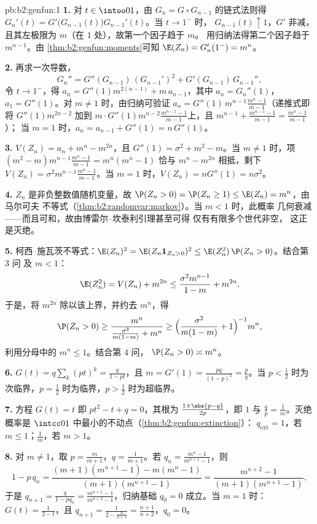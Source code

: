 \begin{solution}{pb:b2:genfun:1}
\textbf{1.} 对 $t \in \intoo01$，由 $G_n = G
\circ G_{n-1}$ 的链式法则得 $G_n'(t) =
G'\bigl(G_{n-1}(t)\bigr)G_{n-1}'(t)$。当 $t \to 1^-$ 时，
$G_{n-1}(t) \uparrow 1$，$G'$ 非减，
且其左极限为 $m$（在 $1$ 处），故第一个因子趋于 $m$。
用归纳法得第二个因子趋于 $m^{n-1}$。由
\cref{thm:b2:genfun:moments}可知 $\E(Z_n) = G_n'(1^-) = m^n$。

\textbf{2.} 再求一次导数，
\[
G_n'' = G''(G_{n-1})\,(G_{n-1}')^2 +
G'(G_{n-1})\,G_{n-1}'',
\]
令 $t \to 1^-$，得 $a_n = G''(1)m^{2(n-1)} + m\,
a_{n-1}$，其中 $a_n = G_n''(1)$，$a_1 = G''(1)$。对 $m \neq
1$ 时，由归纳可验证 $a_n = G''(1)\,m^{n-1}
\frac{m^n - 1}{m - 1}$（递推式即将 $G''(1)m^{2n-2}$
加到 $m\cdot G''(1)m^{n-2}\frac{m^{n-1}-1}{m-1}$上，且
$m^{n-1} + \frac{m^{n-1}-1}{m-1} = \frac{m^n - 1}{m-1}$）；
当 $m = 1$ 时，$a_n = a_{n-1} + G''(1) = n\,G''(1)$。

\textbf{3.} $V(Z_n) = a_n + m^n - m^{2n}$，且 $G''(1) =
\sigma^2 + m^2 - m$。当 $m \neq 1$ 时，项 $(m^2 -
m)m^{n-1}\frac{m^n-1}{m-1} = m^n(m^n - 1)$ 恰与 $m^n -
m^{2n}$ 相抵，剩下 $V(Z_n) =
\sigma^2m^{n-1}\frac{m^n-1}{m-1}$。当 $m = 1$ 时，$V(Z_n) =
nG''(1) = n\sigma^2$。

\textbf{4.} $Z_n$ 是非负整数值随机变量，故
$\P(Z_n > 0) = \P(Z_n \geq 1) \leq \E(Z_n) = m^n$，由马尔可夫
不等式（\cref{thm:b2:randomvar:markov}）。当 $m < 1$ 时，此概率
几何衰减——而且可和，故由博雷尔–坎泰利引理甚至可得
仅有有限多个世代非空，
这正是灭绝。

\textbf{5.} 柯西–施瓦茨不等式：$\E(Z_n)^2 = \E(Z_n\mathbf
1_{Z_n>0})^2 \leq \E(Z_n^2)\,\P(Z_n > 0)$。结合第 3 问
及 $m < 1$：
\[
\E(Z_n^2) = V(Z_n) + m^{2n}
\leq \frac{\sigma^2m^{n-1}}{1-m} + m^{2n},
\]
于是，将 $m^{2n}$ 除以该上界，并约去
$m^n$，得
\[
\P(Z_n > 0) \geq \frac{m^n}{\frac{\sigma^2}{m(1-m)} + m^n}
\geq \Bigl(\frac{\sigma^2}{m(1-m)} + 1\Bigr)^{-1}m^n ,
\]
利用分母中的 $m^n \leq 1$。结合第 4 问，
$\P(Z_n > 0) \asymp m^n$。

\textbf{6.} $G(t) = q\sum_k(pt)^k = \frac{q}{1 - pt}$，且 $m
= G'(1) = \frac{pq}{(1-p)^2} = \frac pq$。当 $p
< \frac12$ 时为次临界，$p = \frac12$ 时为临界，$p
> \frac12$ 时为超临界。

\textbf{7.} 方程 $G(t) = t$ 即 $pt^2 - t + q = 0$，其根为
$\frac{1 \pm \abs{p - q}}{2p}$，即 $1$ 与 $\frac qp =
\frac1m$。灭绝概率是
$\intcc01$ 中最小的不动点（\cref{thm:b2:genfun:extinction}）：
$q_{\mathrm{ext}} = 1$，若 $m \leq 1$；$\frac1m$，若 $m >
1$。

\textbf{8.} 对 $m \neq 1$，取 $p = \frac m{m+1}$，$q =
\frac1{m+1}$。若 $q_n = \frac{m^n - 1}{m^{n+1} - 1}$，则
\[
1 - p\,q_n = \frac{(m+1)(m^{n+1} - 1) - m(m^n - 1)}
{(m+1)(m^{n+1} - 1)} = \frac{m^{n+2} - 1}{(m+1)(m^{n+1} -
1)},
\]
于是 $q_{n+1} = \frac{q}{1 - pq_n} = \frac{m^{n+1} -
1}{m^{n+2} - 1}$，归纳基础 $q_0 = 0$ 成立。当 $m = 1$ 时：
$G(t) = \frac1{2 - t}$，且 $q_{n+1} = \frac1{2 -
\frac{n}{n+1}} = \frac{n+1}{n+2}$，$q_0 = 0$。


\end{solution}
